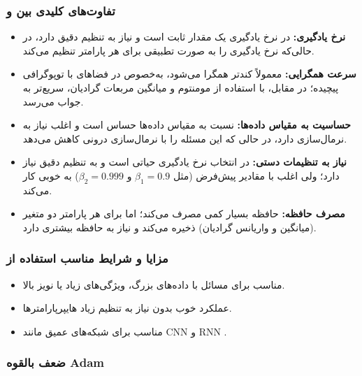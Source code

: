 \subsubsection*{تفاوت‌های کلیدی بین  و }

\begin{itemize}
	\item \textbf{نرخ یادگیری:}  
	در  نرخ یادگیری یک مقدار ثابت است و نیاز به تنظیم دقیق دارد، در حالی‌که  نرخ یادگیری را به صورت تطبیقی برای هر پارامتر تنظیم می‌کند.
	
	\item \textbf{سرعت همگرایی:}  
	 معمولاً کندتر همگرا می‌شود، به‌خصوص در فضاهای با توپوگرافی پیچیده؛ در مقابل،  با استفاده از مومنتوم و میانگین مربعات گرادیان، سریع‌تر به جواب می‌رسد.
	
	\item \textbf{حساسیت به مقیاس داده‌ها:}  
	 نسبت به مقیاس داده‌ها حساس است و اغلب نیاز به نرمال‌سازی دارد، در حالی که  این مسئله را با نرمال‌سازی درونی کاهش می‌دهد.
	
	\item \textbf{نیاز به تنظیمات دستی:}  
	در  انتخاب نرخ یادگیری حیاتی است و به تنظیم دقیق نیاز دارد؛ ولی  اغلب با مقادیر پیش‌فرض (مثل $\beta_1 = 0.9$ و $\beta_2 = 0.999$) به خوبی کار می‌کند.
	
	\item \textbf{مصرف حافظه:}  
	 حافظه بسیار کمی مصرف می‌کند؛ اما  برای هر پارامتر دو متغیر (میانگین و واریانس گرادیان) ذخیره می‌کند و نیاز به حافظه بیشتری دارد.
\end{itemize}


\subsubsection*{مزایا و شرایط مناسب استفاده از }

\begin{itemize}
	\item مناسب برای مسائل با داده‌های بزرگ، ویژگی‌های زیاد یا نویز بالا.
	\item عملکرد خوب بدون نیاز به تنظیم زیاد هایپرپارامترها.
	\item مناسب برای شبکه‌های عمیق مانند CNN و RNN .
\end{itemize}

\subsubsection*{ضعف بالقوه Adam}

